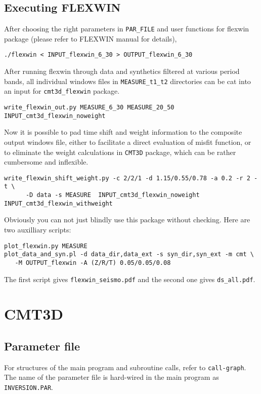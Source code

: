 \documentclass[12pt,titlepage,fleqn]{article}
\begin{document}
\subsection{Executing FLEXWIN}
After choosing the right parameters in \verb=PAR_FILE= and user functions for flexwin package (please refer to FLEXWIN manual for details), 
\begin{verbatim}
./flexwin < INPUT_flexwin_6_30 > OUTPUT_flexwin_6_30
\end{verbatim}
After running flexwin through data and synthetics filtered at various period bands,  all individual windows files in \verb+MEASURE_t1_t2+ directories can be cat into an input for \verb=cmt3d_flexwin= package.
\begin{verbatim}
write_flexwin_out.py MEASURE_6_30 MEASURE_20_50 INPUT_cmt3d_flexwin_noweight
\end{verbatim}
Now it is possible to pad time shift and weight information to the composite output windows file, either to facilitate a direct evaluation of misfit function, or to eliminate the weight calculations in \verb+CMT3D+ package, which can be rather cumbersome and inflexible.
\begin{verbatim}
write_flexwin_shift_weight.py -c 2/2/1 -d 1.15/0.55/0.78 -a 0.2 -r 2 -t \
      -D data -s MEASURE  INPUT_cmt3d_flexwin_noweight INPUT_cmt3d_flexwin_withweight
\end{verbatim}
Obviously you can not just blindly use this package without checking. Here are two auxilliary scripts:
\begin{verbatim}
plot_flexwin.py MEASURE 
plot_data_and_syn.pl -d data_dir,data_ext -s syn_dir,syn_ext -m cmt \
   -M OUTPUT_flexwin -A (Z/R/T) 0.05/0.05/0.08 
\end{verbatim}
The first script gives \verb+flexwin_seismo.pdf+ and the second one gives \verb+ds_all.pdf+.
\section{CMT3D}
\subsection{Parameter file}
For structures of the main program and subroutine calls, refer to \verb=call-graph=. The name of the parameter file is hard-wired in the main program as \verb=INVERSION.PAR=.
\end{document}
